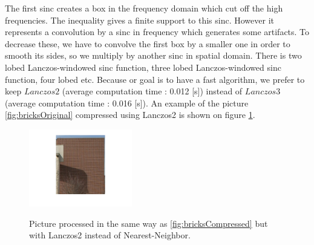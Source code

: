 The first sinc creates a box in the frequency domain which cut off the high frequencies. The inequality gives a finite support to this sinc. However it represents a convolution by a sinc in frequency which generates some artifacts. To decrease these, we have to convolve the first box by a smaller one in order to smooth its sides, so we multiply by another sinc in spatial domain. 
There is two lobed Lanczos-windowed sinc function, three lobed Lanczos-windowed sinc function, four lobed etc. Because or goal is to have a fast algorithm, we prefer to keep $Lanczos2$ (average computation time :  0.012 [s]) instead of $Lanczos3$ (average computation time : 0.016 [s]). An example of the picture \ref{fig:bricksOriginal} compressed using Lanczos2 is shown on figure \ref{fig:bricksLanczos}.

\begin{figure}
\centering
\includegraphics[width = 0.4\textwidth]{../Images/bricksLanczos.png}
\label{fig:bricksLanczos}
\caption{Picture processed in the same way as \ref{fig:bricksCompressed} but with Lanczos2 instead of Nearest-Neighbor.}
\end{figure}
%
